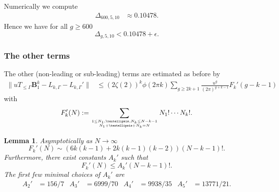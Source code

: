 \documentclass[12pt]{amsart}
\newtheorem{lem}[thm]{Lemma}
\theoremstyle{definition}
\numberwithin{equation}{section}
\newcommand{\bB}{\mathbf{B}}
\newcommand{\numcheck}[1]{\cite[Computation #1]{SupplementaryNotebook}}
\theoremstyle{definition} %
\theoremstyle{remark}
\begin{document}
Numerically we compute \numcheck{DELTAEVAL}
\begin{align*}
\Delta_{600,5,10} &\approx 0.10478. %
\end{align*}
Hence we have for all $g\geq 600$
\[
    \Delta_{g,5,10} < 0.10478 +\epsilon.
\]

\subsubsection{The other terms} \label{ot}
The other (non-leading or sub-leading) terms are estimated as before by 
\begin{align*}
    \|u T_{\leq \Gamma} \bB_1^k-L_{k,\Gamma}-L_{k,\Gamma}'\| &\leq
    (2\zeta(2))^k 
    \phi(2\pi k)
    \sum_{g\geq 2k+1}
    \frac{u^g}{(2\pi)^{g+k-1}}
    F_k'(g-k-1)
  \end{align*}
with  
\[
    F_k'(N)
    :=
    \sum_{1\leq N_1,\dots,N_k\leq N-k-1\atop N_1+\dots+N_k=N}
    N_1!\cdots N_k!.
\]
\begin{lem}
Asymptotically as $N\to\infty$
\[
    F_k'(N) \sim (6k(k-1)+2k(k-1)(k-2)) (N-k-1)!.
\]
Furthermore, there exist constants $A_k'$ such that
\[
    F_k'(N) \leq A_k'(N-k-1)!.
\]
The first few minimal choices of $A_k'$ are
\begin{align*}
    A_2'&=156/7 & A_3'&=6999/70 & A_4'&=9938/35 & A_5'&=13771/21.
\end{align*}
\end{lem}
\end{document}
